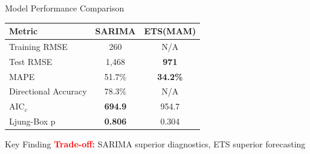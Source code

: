 \documentclass[10pt]{beamer}
\begin{document}
\begin{frame}{Model Performance Comparison}
\begin{table}[h]
\centering
\small
\begin{tabular}{lcc}
\toprule
Metric & SARIMA & ETS(MAM) \\
\midrule
Training RMSE & 260 & N/A \\
Test RMSE & 1,468 & \textbf{971} \\
MAPE & 51.7\% & \textbf{34.2\%} \\
Directional Accuracy & 78.3\% & N/A \\
AIC$_c$ & \textbf{694.9} & 954.7 \\
Ljung-Box p & \textbf{0.806} & 0.304 \\
\bottomrule
\end{tabular}
\end{table}

\begin{alertblock}{Key Finding}
\textcolor{red}{\textbf{Trade-off:}} SARIMA superior diagnostics, ETS superior forecasting
\end{alertblock}
\end{frame}
\end{document}
